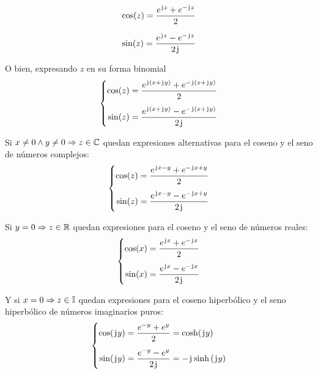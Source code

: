 \begin{mdframed}[style=PropertyFrame]
    \begin{prop}
    \end{prop}
    \begin{equation*}
        \cos(z) = \frac{e^{\mkern2mu\mathrm{j}\mkern1mu z} + e^{-\mkern2mu\mathrm{j}\mkern1mu z}}{2}
    \end{equation*}
\end{mdframed}

\begin{mdframed}[style=PropertyFrame]
    \begin{prop}
    \end{prop}
    \begin{equation*}
        \sin(z) = \frac{e^{\mkern2mu\mathrm{j}\mkern1mu z} - e^{-\mkern2mu\mathrm{j}\mkern1mu z}}{2 \mkern2mu\mathrm{j}\mkern1mu}
    \end{equation*}
\end{mdframed}

O bien, expresando $z$ en su forma binomial
\begin{equation*}
    \left\{
    \begin{aligned}
        \cos(z) = \frac{e^{\mkern2mu\mathrm{j}\mkern1mu \left(x + \mkern2mu\mathrm{j}\mkern1mu y \right)} + e^{-\mkern2mu\mathrm{j}\mkern1mu \left(x + \mkern2mu\mathrm{j}\mkern1mu y \right)}}{2}
        \\[1ex]
        \sin(z) = \frac{e^{\mkern2mu\mathrm{j}\mkern1mu \left(x + \mkern2mu\mathrm{j}\mkern1mu y \right)} - e^{-\mkern2mu\mathrm{j}\mkern1mu \left(x+\mkern2mu\mathrm{j}\mkern1mu y\right)}}{2 \mkern2mu\mathrm{j}\mkern1mu}
    \end{aligned}
    \right.
\end{equation*}

Si $x \neq 0 \land y \neq 0 \Rightarrow z \in \mathbb{C}$ quedan expresiones alternativas para el coseno y el seno de números complejos:
\begin{equation*}
    \left\{
    \begin{aligned}
        \cos(z) &= \frac{e^{\mkern2mu\mathrm{j}\mkern1mu x - y} + e^{-\mkern2mu\mathrm{j}\mkern1mu x + y}}{2}
        \\[1ex]
        \sin(z) &= \frac{e^{\mkern2mu\mathrm{j}\mkern1mu x - y} - e^{-\mkern2mu\mathrm{j}\mkern1mu x + y}}{2\mkern2mu\mathrm{j}\mkern1mu}
    \end{aligned}
    \right.
\end{equation*}

Si $y=0 \Rightarrow z \in \mathbb{R}$ quedan expresiones para el coseno y el seno de números reales:
\begin{equation*}
    \left\{
    \begin{aligned}
        \cos(x) &= \frac{e^{\mkern2mu\mathrm{j}\mkern1mu x} + e^{-\mkern2mu\mathrm{j}\mkern1mu x}}{2}
        \\[1ex]
        \sin(x) &= \frac{e^{\mkern2mu\mathrm{j}\mkern1mu x} - e^{-\mkern2mu\mathrm{j}\mkern1mu x}}{2\mkern2mu\mathrm{j}\mkern1mu}
    \end{aligned}
    \right.
\end{equation*}

Y si $x=0 \Rightarrow z \in \mathbb{I}$ quedan expresiones para el coseno hiperbólico y el seno hiperbólico de números imaginarios puros:
\begin{equation*}
    \left\{
    \begin{aligned}
        \cos(\mkern2mu\mathrm{j}\mkern1mu y) &= \frac{e^{-y} + e^y}{2} = \cosh(\mkern2mu\mathrm{j}\mkern1mu y)
        \\[1ex]
        \sin(\mkern2mu\mathrm{j}\mkern1mu y) &= \frac{e^{-y} - e^y}{2\mkern2mu\mathrm{j}\mkern1mu} = -\mkern2mu\mathrm{j}\mkern1mu \sinh{(\mkern2mu\mathrm{j}\mkern1muy)}
    \end{aligned}
    \right.
\end{equation*}